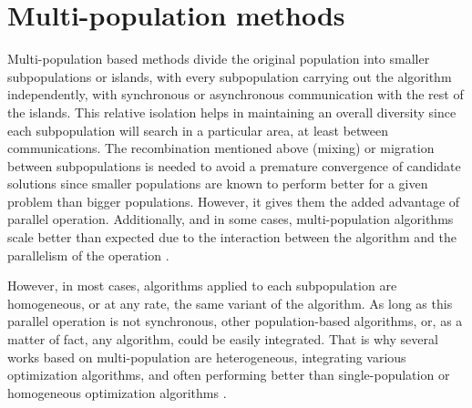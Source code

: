 \documentclass[review]{elsarticle}
\begin{document}

\section{Multi-population methods} %
\label{multi}

Multi-population based methods divide the original population into
smaller subpopulations or islands, with every subpopulation carrying out the
algorithm independently, with synchronous or asynchronous communication with the
rest of the islands. %
This relative isolation helps in maintaining an overall
diversity since each subpopulation will search in a particular area, at least
between communications. The recombination mentioned above (mixing) or migration
between subpopulations is needed to avoid a premature convergence of candidate
solutions since smaller populations are known to perform better for a given
problem than bigger populations. %
However, it gives them the added advantage of
parallel operation. Additionally, and in some cases, multi-population algorithms
scale better than expected due to the interaction between the algorithm and the
parallelism of the operation \cite{ALBA20027}. %

However, in most cases, algorithms applied to each subpopulation are
homogeneous, or at any rate, the same variant of the algorithm. As long as this
parallel operation is not synchronous, other population-based algorithms, or, as
a matter of fact, any algorithm, could be easily integrated. That is why several
works based on multi-population are heterogeneous, integrating various
optimization algorithms, and often performing better than single-population or
homogeneous optimization algorithms \cite{wu2016differential,nseef2016adaptive}.
\end{document}
